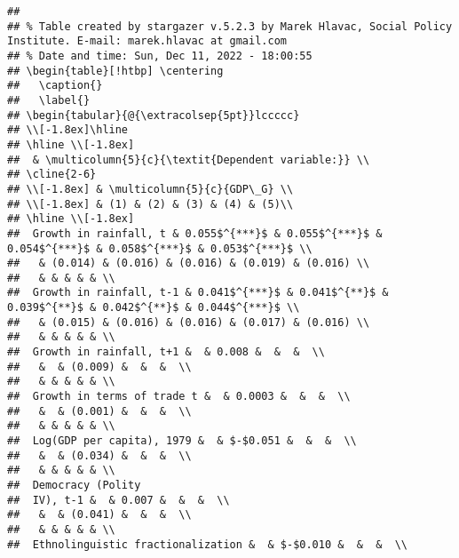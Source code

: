 \documentclass[
]{article}
\begin{document}
\begin{verbatim}
## 
## % Table created by stargazer v.5.2.3 by Marek Hlavac, Social Policy Institute. E-mail: marek.hlavac at gmail.com
## % Date and time: Sun, Dec 11, 2022 - 18:00:55
## \begin{table}[!htbp] \centering 
##   \caption{} 
##   \label{} 
## \begin{tabular}{@{\extracolsep{5pt}}lccccc} 
## \\[-1.8ex]\hline 
## \hline \\[-1.8ex] 
##  & \multicolumn{5}{c}{\textit{Dependent variable:}} \\ 
## \cline{2-6} 
## \\[-1.8ex] & \multicolumn{5}{c}{GDP\_G} \\ 
## \\[-1.8ex] & (1) & (2) & (3) & (4) & (5)\\ 
## \hline \\[-1.8ex] 
##  Growth in rainfall, t & 0.055$^{***}$ & 0.055$^{***}$ & 0.054$^{***}$ & 0.058$^{***}$ & 0.053$^{***}$ \\ 
##   & (0.014) & (0.016) & (0.016) & (0.019) & (0.016) \\ 
##   & & & & & \\ 
##  Growth in rainfall, t-1 & 0.041$^{***}$ & 0.041$^{**}$ & 0.039$^{**}$ & 0.042$^{**}$ & 0.044$^{***}$ \\ 
##   & (0.015) & (0.016) & (0.016) & (0.017) & (0.016) \\ 
##   & & & & & \\ 
##  Growth in rainfall, t+1 &  & 0.008 &  &  &  \\ 
##   &  & (0.009) &  &  &  \\ 
##   & & & & & \\ 
##  Growth in terms of trade t &  & 0.0003 &  &  &  \\ 
##   &  & (0.001) &  &  &  \\ 
##   & & & & & \\ 
##  Log(GDP per capita), 1979 &  & $-$0.051 &  &  &  \\ 
##   &  & (0.034) &  &  &  \\ 
##   & & & & & \\ 
##  Democracy (Polity
##  IV), t-1 &  & 0.007 &  &  &  \\ 
##   &  & (0.041) &  &  &  \\ 
##   & & & & & \\ 
##  Ethnolinguistic fractionalization &  & $-$0.010 &  &  &  \\ 

\end{verbatim}
\end{document}
